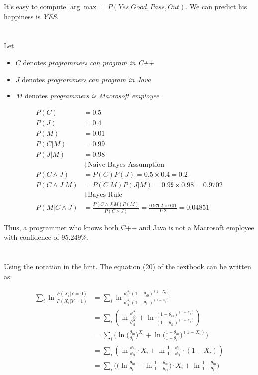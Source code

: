 \documentclass[12pt, letterpaper]{article}
\begin{document}
It's easy to compute $\arg\max = P(Yes|Good, Pass, Out)$. We can predict his happiness is \emph{YES}.

\section{}

Let 
\begin{itemize}
\item $C$ denotes \emph{programmers can program in C++}
\item $J$ denotes \emph{programmers can program in Java}
\item $M$ denotes \emph{programmers is Macrosoft employee}.
\end{itemize}

\begin{align*}
P(C)&=0.5\\
P(J)&=0.4\\
P(M)&=0.01\\
P(C|M)&=0.99\\
P(J|M)&=0.98\\
&\Downarrow\text{Naive Bayes Assumption}\\
P(C \land J)&=P(C)P(J)=0.5\times0.4=0.2\\
P(C \land J | M)&=P(C | M)P(J | M)=0.99\times0.98=0.9702\\
&\Downarrow\text{Bayes Rule}\\
P(M|C\land J)&=\frac{P(C\land J | M)P(M)}{P(C \land J)}=\frac{0.9702\times0.01}{0.2}=0.04851
\end{align*}

Thus, a programmer who knows both C++ and Java is not a Macrosoft employee with confidence of $95.249\%$.

\section{}

Using the notation in the hint. The equation (20) of the textbook can be
written as:

\begin{align*}
\sum_i\ln\frac{P(X_i|Y=0)}{P(X_i|Y=1)}
&=\sum_i\ln\frac{\theta_{i0}^{X_i}(1-\theta_{i0})^{(1-X_i)}}{\theta_{i1}^{X_i}(1-\theta_{i1})^{(1-X_i)}}\\
&=\sum_i\left(\ln\frac{\theta_{i0}^{X_i}}{\theta_{i1}^{X_i}}+\ln\frac{(1-\theta_{i0})^{(1-X_i)}}{(1-\theta_{i1})^{(1-X_i)}}\right)\\
&=\sum_i\Bigg(\ln\bigg(\frac{\theta_{i0}}{\theta_{i1}}\bigg)^{X_i}+\ln\bigg(\frac{1-\theta_{i0}}{1-\theta_{i1}}\bigg)^{(1-X_i)}\Bigg)\\
&=\sum_i\left(\ln\frac{\theta_{i0}}{\theta_{i1}}\cdot{X_i}+\ln\frac{1-\theta_{i0}}{1-\theta_{i1}}\cdot{(1-X_i)}\right)\\
&=\sum_i\Bigg(\bigg(\ln\frac{\theta_{i0}}{\theta_{i1}}-\ln\frac{1-\theta_{i0}}{1-\theta_{i1}}\bigg)\cdot{X_i}+\ln\frac{1-\theta_{i0}}{1-\theta_{i1}}\Bigg)
\end{align*}
\end{document}
